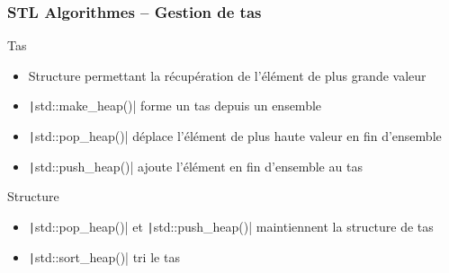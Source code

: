 \documentclass[C++.tex]{subfiles}
\begin{document}
\begin{frame}[fragile]
	\frametitle{STL Algorithmes -- Gestion de tas}
	\begin{block}{Tas}
		\begin{itemize}
			\item Structure permettant la récupération de l'élément de plus grande valeur
		\end{itemize}
	\end{block}

	\begin{itemize}
		\item \texttt|std::make_heap()| forme un tas depuis un ensemble
		\item \texttt|std::pop_heap()| déplace l'élément de plus haute valeur en fin d'ensemble
		\item \texttt|std::push_heap()| ajoute l'élément en fin d'ensemble au tas
	\end{itemize}

	\begin{block}{Structure}
		\begin{itemize}
			\item \texttt|std::pop_heap()| et \texttt|std::push_heap()| maintiennent la structure de tas
		\end{itemize}
	\end{block}

	\begin{itemize}
		\item \texttt|std::sort_heap()| tri le tas
	\end{itemize}


\end{frame}
\end{document}
